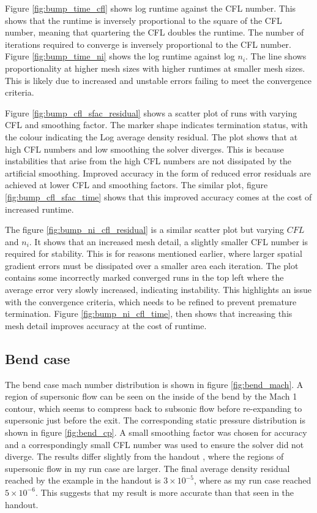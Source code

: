 \documentclass{article}
\begin{document}
Figure \ref{fig:bump_time_cfl} shows log runtime against the CFL number.
This shows that the runtime is inversely proportional to the square of the CFL number, meaning that quartering the CFL doubles the runtime.
The number of iterations required to converge is inversely proportional to the CFL number.
Figure \ref{fig:bump_time_ni} shows the log runtime against log $n_i$.
The line shows proportionality at higher mesh sizes with higher runtimes at smaller mesh sizes.
This is likely due to increased and unstable errors failing to meet the convergence criteria.

Figure \ref{fig:bump_cfl_sfac_residual} shows a scatter plot of runs with varying CFL and smoothing factor.
The marker shape indicates termination status, with the colour indicating the Log average density residual.
The plot shows that at high CFL numbers and low smoothing the solver diverges.
This is because instabilities that arise from the high CFL numbers are not dissipated by the artificial smoothing.
Improved accuracy in the form of reduced error residuals are achieved at lower CFL and smoothing factors.
The similar plot, figure \ref{fig:bump_cfl_sfac_time} shows that this improved accuracy comes at the cost of increased runtime.

The figure \ref{fig:bump_ni_cfl_residual} is a similar scatter plot but varying $CFL$ and $n_i$.
It shows that an increased mesh detail, a slightly smaller CFL number is required for stability.
This is for reasons mentioned earlier, where larger spatial gradient errors must be dissipated over a smaller area each iteration.
The plot contains some incorrectly marked converged runs in the top left where the average error very slowly increased, indicating instability.
This highlights an issue with the convergence criteria, which needs to be refined to prevent premature termination.
Figure \ref{fig:bump_ni_cfl_time}, then shows that increasing this mesh detail improves accuracy at the cost of runtime.

\subsection{Bend case}

The bend case mach number distribution is shown in figure \ref{fig:bend_mach}.
A region of supersonic flow can be seen on the inside of the bend by the Mach 1 contour, which seems to compress back to subsonic flow before re-expanding to supersonic just before the exit.
The corresponding static pressure distribution is shown in figure \ref{fig:bend_cp}.
A small smoothing factor was chosen for accuracy and a correspondingly small CFL number was used to ensure the solver did not diverge.
The results differ slightly from the handout \cite{handout}, where the regions of supersonic flow in my run case are larger.
The final average density residual reached by the example in the handout is $3\times 10^{-5}$, where as my run case reached $5\times 10^{-6}$.
This suggests that my result is more accurate than that seen in the handout.
\end{document}
